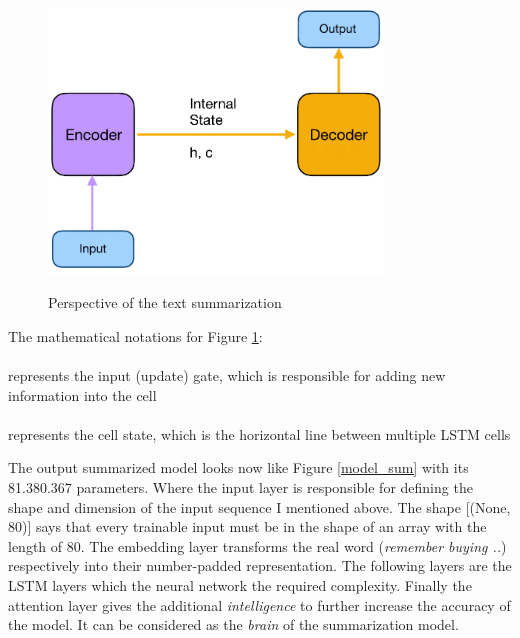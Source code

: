 \begin{figure}
	\begin{center}
		\includegraphics[width=3.5in]{photos/modelenc-1}\\
		\caption{Perspective of the text summarization}\label{modelenc}
	\end{center}
\end{figure}

\begin{tcolorbox}
	The mathematical notations for Figure \ref{modelenc}: \\ \\
	 represents the input (update) gate, which is responsible for adding new information into the cell \\ \\
	 represents the cell state, which is the horizontal line between multiple LSTM cells
\end{tcolorbox}

The output summarized model looks now like Figure \ref{model_sum} with its 81.380.367 parameters. Where the input layer is responsible for defining the shape and dimension of the input sequence I mentioned above. The shape [(None, 80)] says that every trainable input must be in the shape of an array with the length of 80. The embedding layer transforms the real word (\textit{remember buying ..}) respectively into their number-padded representation. The following layers are the LSTM layers which the neural network the required complexity. Finally the attention layer gives the additional \textit{intelligence} to further increase the accuracy of the model. It can be considered as the \textit{brain} of the summarization model. \\

